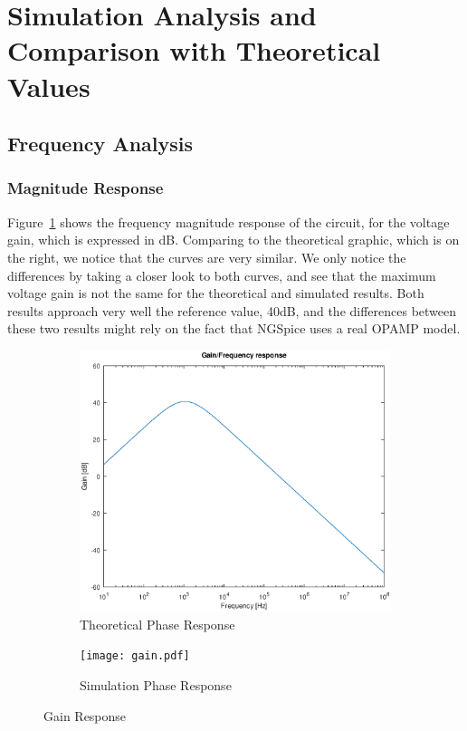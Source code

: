 \section{Simulation Analysis and Comparison with Theoretical Values}
\label{sec:simulation}

\subsection{Frequency Analysis}
\subsubsection{Magnitude Response}

Figure~\ref{fig:gain} shows the frequency magnitude response of the circuit, for the voltage gain, which is expressed in dB. Comparing to the theoretical graphic, which is on the right, we notice that the curves are very similar. We only notice the differences by taking a closer look to both curves, and see that the maximum voltage gain is not the same for the theoretical and simulated results. Both results approach very well the reference value, 40dB, and the differences between these two results might rely on the fact that NGSpice uses a real OPAMP model.

\begin{figure}[H]
\centering
\begin{subfigure}{.5\textwidth}
    \centering
    \vspace{2.8 cm}
    \includegraphics[scale=0.4]{gain_response.eps}
    \caption{Theoretical Phase Response}
\end{subfigure}%
\begin{subfigure}{.5\textwidth}
    \centering
    \texttt{[image: gain.pdf]}
    \caption{Simulation Phase Response}
\end{subfigure}
\caption{Gain Response}
\label{fig:gain}
\end{figure}
\vspace{-2.5cm}
